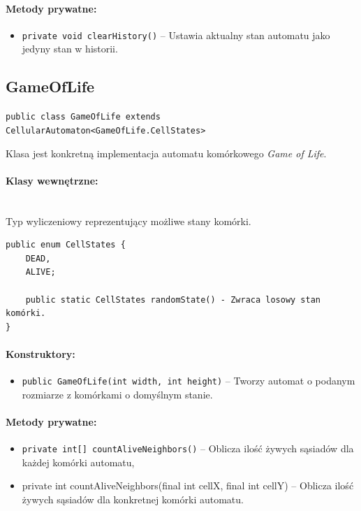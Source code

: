 \documentclass{report}
\begin{document}
\paragraph{Metody prywatne:}
\begin{itemize}
	\item \texttt{private void clearHistory()} -- Ustawia aktualny stan automatu jako jedyny stan w historii.
\end{itemize}

\subsection{GameOfLife}
\texttt{public class GameOfLife extends CellularAutomaton<GameOfLife.CellStates>}

Klasa jest konkretną implementacja automatu komórkowego \textit{Game of Life}.

\paragraph{Klasy wewnętrzne:} \mbox{} \\
Typ wyliczeniowy reprezentujący możliwe stany komórki.
\begin{verbatim}
public enum CellStates {
    DEAD,
    ALIVE;

    public static CellStates randomState() - Zwraca losowy stan komórki.
}
\end{verbatim}

\paragraph{Konstruktory:}
\begin{itemize}
	\item \texttt{public GameOfLife(int width, int height)} -- Tworzy automat o podanym rozmiarze z komórkami o domyślnym stanie.
\end{itemize}

\paragraph{Metody prywatne:}
\begin{itemize}
    \item \texttt{private int[] countAliveNeighbors()} -- Oblicza ilość żywych sąsiadów dla każdej komórki automatu,
    \item private int countAliveNeighbors(final int cellX, final int cellY) -- Oblicza ilość żywych sąsiadów dla konkretnej komórki automatu.
\end{itemize}
\end{document}
